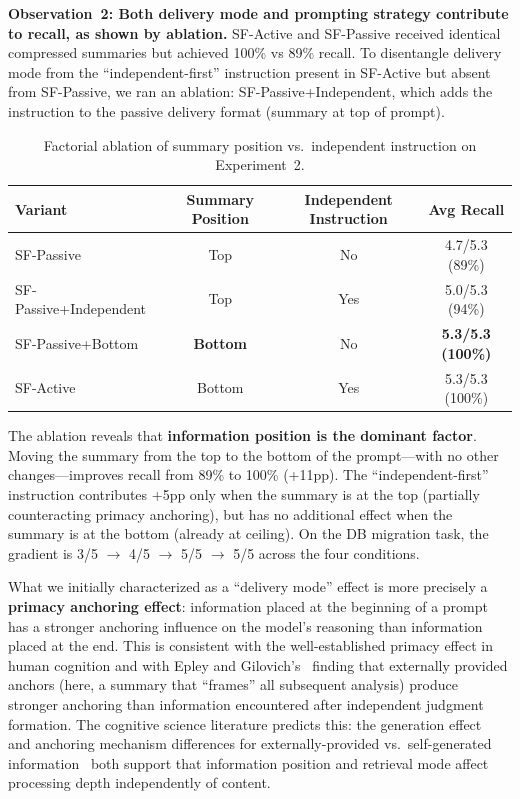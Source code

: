 \documentclass[11pt]{article}
\begin{document}
\textbf{Observation~2: Both delivery mode and prompting strategy contribute to recall, as shown by ablation.} SF-Active and SF-Passive received identical compressed summaries but achieved 100\% vs 89\% recall. To disentangle delivery mode from the ``independent-first'' instruction present in SF-Active but absent from SF-Passive, we ran an ablation: SF-Passive+Independent, which adds the instruction to the passive delivery format (summary at top of prompt).

\begin{table}[H]
\centering
\caption{Factorial ablation of summary position vs.\ independent instruction on Experiment~2.}
\label{tab:ablation}
\small
\begin{tabular}{@{}lccc@{}}
\toprule
\textbf{Variant} & \textbf{Summary Position} & \textbf{Independent Instruction} & \textbf{Avg Recall} \\
\midrule
SF-Passive              & Top    & No           & 4.7/5.3 (89\%) \\
SF-Passive+Independent  & Top    & Yes          & 5.0/5.3 (94\%) \\
SF-Passive+Bottom       & \textbf{Bottom} & No  & \textbf{5.3/5.3 (100\%)} \\
SF-Active               & Bottom & Yes          & 5.3/5.3 (100\%) \\
\bottomrule
\end{tabular}
\end{table}

The ablation reveals that \textbf{information position is the dominant factor}. Moving the summary from the top to the bottom of the prompt---with no other changes---improves recall from 89\% to 100\% (+11pp). The ``independent-first'' instruction contributes +5pp only when the summary is at the top (partially counteracting primacy anchoring), but has no additional effect when the summary is at the bottom (already at ceiling). On the DB migration task, the gradient is 3/5 $\to$ 4/5 $\to$ 5/5 $\to$ 5/5 across the four conditions.

What we initially characterized as a ``delivery mode'' effect is more precisely a \textbf{primacy anchoring effect}: information placed at the beginning of a prompt has a stronger anchoring influence on the model's reasoning than information placed at the end. This is consistent with the well-established primacy effect in human cognition and with Epley and Gilovich's~\citep{epley2006anchoring} finding that externally provided anchors (here, a summary that ``frames'' all subsequent analysis) produce stronger anchoring than information encountered after independent judgment formation. The cognitive science literature predicts this: the generation effect~\citep{slamecka1978generation} and anchoring mechanism differences for externally-provided vs.\ self-generated information~\citep{epley2006anchoring} both support that information position and retrieval mode affect processing depth independently of content.
\end{document}
